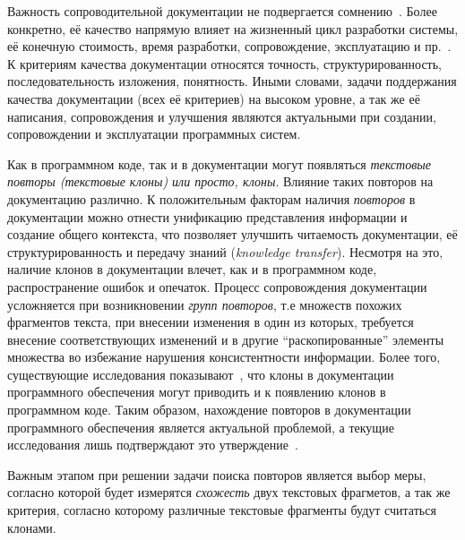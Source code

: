 Важность сопроводительной документации не подвергается сомнению~\cite{kipyegen2013importance,chomal2014significance}.
Более конкретно, её качество напрямую влияет на жизненный цикл разработки системы, её конечную стоимость, время разработки, сопровождение, эксплуатацию и пр.~\cite{plosch2014value}. 
К критериям качества документации относятся точность, структурированность, последовательность изложения, понятность.
Иными словами, задачи поддержания качества документации (всех её критериев) на высоком уровне, а так же её написания, сопровождения и улучшения являются актуальными при создании, сопровождении и эксплуатации программных систем.

Как в программном коде, так и в документации могут появляться \emph{текстовые повторы (текстовые клоны) или просто, \emph{клоны}}.
Влияние таких повторов на документацию различно.
К положительным факторам наличия \emph{повторов} в документации можно отнести унификацию представления информации и создание общего контекста, что позволяет улучшить читаемость документации, её структурированность и передачу знаний (\emph{knowledge transfer}).
Несмотря на это, наличие клонов в документации влечет, как и в программном коде,  распространение ошибок и опечаток.
Процесс сопровождения документации усложняется при возникновении \emph{групп повторов}, т.е множеств похожих фрагментов текста, при внесении изменения в один из которых, требуется внесение соответствующих изменений и в другие ``раскопированные'' элементы множества во избежание нарушения консистентности информации.
Более того, существующие исследования показывают~\cite{juergens2010can}, что клоны в документации программного обеспечения могут приводить и к появлению клонов в программном коде.
Таким образом, нахождение повторов в документации программного обеспечения является актуальной проблемой, а текущие исследования лишь подтверждают это утверждение~\cite{horie2010tool, poruban2014reusable, poruban2016preliminary, juergens2010can, oumaziz2017documentation}.

Важным этапом при решении задачи поиска повторов является выбор
меры, согласно которой будет измерятся \emph{схожесть} двух текстовых фрагметов, а так же критерия, согласно которому различные текстовые фрагменты будут считаться клонами.

